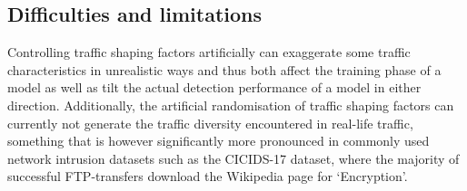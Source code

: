 \documentclass[10pt,conference]{IEEEtran}
\begin{document}







\subsection{Difficulties and limitations}


Controlling traffic shaping factors artificially can exaggerate some traffic characteristics in unrealistic ways and thus both affect the training phase of a model as well as tilt the actual detection performance of a model in either direction. Additionally, the artificial randomisation of traffic shaping factors can currently not generate the traffic diversity encountered in real-life traffic, something that is however significantly more pronounced in commonly used network intrusion datasets such as the CICIDS-17 dataset, where the majority of successful FTP-transfers download the Wikipedia page for ‘Encryption’.
\end{document}
